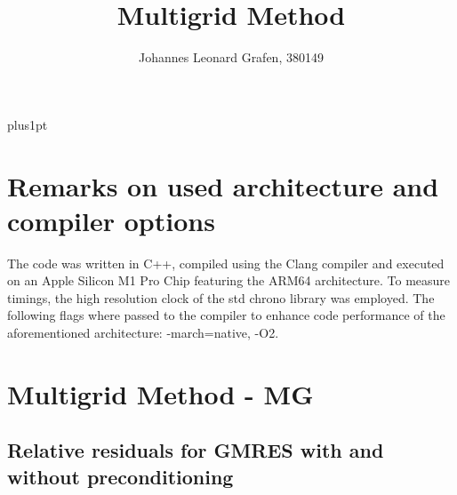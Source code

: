 \documentclass[11pt,a4paper]{article}
\title{Multigrid Method}
\author{Johannes Leonard Grafen, 380149}
\begin{document}
\renewcommand\baselinestretch{1.0}
\baselineskip=18pt plus1pt	

\maketitle
\newpage
{}
\tableofcontents
\listoffigures	%
\listoftables  %
\newpage

\section{Remarks on used architecture and compiler options}
The code was written in C++, compiled using the Clang compiler and executed on an Apple Silicon M1 Pro Chip featuring the ARM64 architecture. To measure timings, the high resolution clock of the std chrono library was employed. The following flags where passed to the compiler to enhance code performance of the aforementioned architecture: -march=native, -O2. 

\section{Multigrid Method - MG}
\label{chapter:MG}

\subsection{Relative residuals for GMRES with and without preconditioning}


%
%
\end{document}
